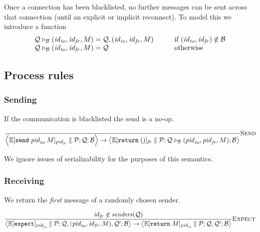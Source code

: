 \documentclass{article}
\newcommand{\sReturn}{\mathtt{return}}
\newcommand{\sExpect}{\mathtt{expect}}
\newcommand{\sSend}{\mathtt{send}}
\newcommand{\sExtend}[1]{\mathrel{\triangleright_{#1}}}
\newcommand{\sPar}{\mathrel{\parallel}}
\newcommand{\sPid}{\ensuremath{\mathit{pid}}}
\newcommand{\sId}{\ensuremath{\mathit{id}}}
\newcommand{\sSystem}[3]{\left\langle #1 ; #2 ; #3 \right\rangle}
\newcommand{\sQueue}{\mathcal{Q}}
\newcommand{\sProcesses}{\mathcal{P}}
\newcommand{\sBlacklist}{\mathcal{B}}
\newcommand{\sCtxt}[1]{\mathbb{#1}}
\newcommand{\sSenders}{\mathit{senders}}
\begin{document}
Once a connection has been blacklisted, no further messages can be sent across
that connection (until an explicit or implicit reconnect). To model this we
introduce a function
%
\begin{equation*}
\begin{array}{l@{\;=\;}l@{\hspace{3em}}l}
  \sQueue \sExtend{\sBlacklist} (\sId_\mathit{to}, \sId_\mathit{fr}, M) 
& 
  \sQueue,  (\sId_\mathit{to}, \sId_\mathit{fr}, M)
&
  \text{if } (\sId_\mathit{to}, \sId_\mathit{fr}) \notin \sBlacklist
\\
  \sQueue \sExtend{\sBlacklist} (\sId_\mathit{to}, \sId_\mathit{fr}, M) 
& 
  \sQueue
&
  \text{otherwise}
\end{array}
\end{equation*}

\subsection{Process rules}

\subsubsection{Sending}

If the communication is blacklisted the send is a no-op.

\begin{equation*}
\frac{
}{
  \sSystem{   \sCtxt{E}[ \sSend \; \sPid_\mathit{to} \; M ]_{\sPid_\mathit{fr}} 
            \sPar
              \sProcesses
          }
          {\sQueue}
          {\sBlacklist}
\rightarrow 
  \sSystem{\sCtxt{E}[ \sReturn \; () ]_\mathit{fr} \sPar \sProcesses}
          {\sQueue \sExtend{\sBlacklist} (\sPid_\mathit{to}, \sPid_\mathit{fr}, M)}
          {\sBlacklist}
} \textsc{Send}
\end{equation*}

We ignore issues of serializability for the purposes of this semantics.

\subsubsection{Receiving}

We return the \emph{first} message of a randomly chosen sender.

\begin{equation*}
\frac{
  \sId_{\mathit{fr}} \notin \sSenders(\sQueue)
}{
  \sSystem{\sCtxt{E}[ \sExpect ]_{\sPid_\mathit{to}} \sPar \sProcesses}
          {\sQueue, (\sPid_\mathit{to}, \sId_\mathit{fr}, M), \sQueue'}
          {\sBlacklist}
\rightarrow
  \sSystem{\sCtxt{E}[ \sReturn \; M ]_{\sPid_\mathit{to}} \sPar \sProcesses}
          {\sQueue, \sQueue'}
          {\sBlacklist}
} \textsc{Expect}
\end{equation*}
\end{document}
